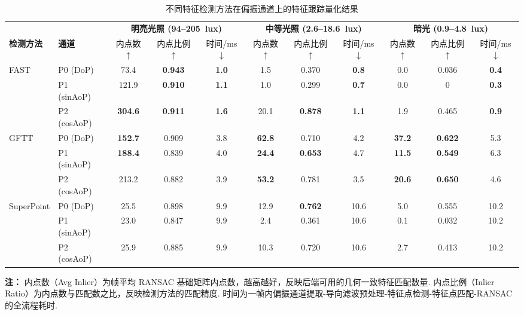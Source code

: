 
\begin{table}[t]
\centering
\caption{不同特征检测方法在偏振通道上的特征跟踪量化结果}
\label{tab:fp_metrics}
\footnotesize
\setlength{\tabcolsep}{3.5pt}
\begin{tabular}{llccccccccc}
\toprule
& & \multicolumn{3}{c}{\bfseries 明亮光照 (94--205~lux)} & \multicolumn{3}{c}{\bfseries 中等光照 (2.6--18.6~lux)} & \multicolumn{3}{c}{\bfseries 暗光 (0.9--4.8~lux)} \\
\cmidrule(lr){3-5} \cmidrule(lr){6-8} \cmidrule(lr){9-11}
\multirow{-2}{*}{\bfseries 检测方法} & \multirow{-2}{*}{\bfseries 通道} & 内点数$\uparrow$ & 内点比例$\uparrow$ & 时间/ms$\downarrow$ & 内点数$\uparrow$ & 内点比例$\uparrow$ & 时间/ms$\downarrow$ & 内点数$\uparrow$ & 内点比例$\uparrow$ & 时间/ms$\downarrow$ \\
\midrule

\multirow{3}{*}{FAST}
    & P0 (DoP)     & 73.4  & \textbf{0.943} & \textbf{1.0}  & 1.5   & 0.370 & \textbf{0.8}  & 0.0   & 0.036 & \textbf{0.4} \\
    & P1 (sinAoP)  & 121.9 & \textbf{0.910} & \textbf{1.1}  & 1.0   & 0.299 & \textbf{0.7}  & 0.0   & 0     & \textbf{0.3} \\
    & P2 (cosAoP)  & \textbf{304.6} & \textbf{0.911} & \textbf{1.6}  & 20.1  & \textbf{0.878} & \textbf{1.1}  & 1.9   & 0.465 & \textbf{0.9} \\
\cmidrule{2-11}

\multirow{3}{*}{GFTT}
    & P0 (DoP)     & \textbf{152.7} & 0.909 & 3.8  & \textbf{62.8} & 0.710 & 4.2  & \textbf{37.2} & \textbf{0.622} & 5.3 \\
    & P1 (sinAoP)  & \textbf{188.4} & 0.839 & 4.0  & \textbf{24.4} & \textbf{0.653} & 4.7  & \textbf{11.5} & \textbf{0.549} & 6.3 \\
    & P2 (cosAoP)  & 213.2 & 0.882 & 3.9  & \textbf{53.2} & 0.781 & 3.5  & \textbf{20.6} & \textbf{0.650} & 4.6 \\
\cmidrule{2-11}

\multirow{3}{*}{SuperPoint}
    & P0 (DoP)     & 25.5  & 0.898 & 9.9  & 12.9  & \textbf{0.762} & 10.6 & 5.0   & 0.555 & 10.2 \\
    & P1 (sinAoP)  & 23.0  & 0.847 & 9.9  & 2.4   & 0.361 & 10.6 & 0.1   & 0.032 & 10.2 \\
    & P2 (cosAoP)  & 25.9  & 0.885 & 9.9  & 10.3  & 0.720 & 10.6 & 2.7   & 0.413 & 10.2 \\

\midrule
\end{tabular}

\vspace{4pt}
\begin{minipage}{\textwidth}
\footnotesize
\textbf{注：}
内点数（Avg Inlier）为帧平均 RANSAC 基础矩阵内点数，越高越好，反映后端可用的几何一致特征匹配数量.
内点比例（Inlier Ratio）为内点数与匹配数之比，反映检测方法的匹配精度.
时间为一帧内偏振通道提取-导向滤波预处理-特征点检测-特征点匹配-RANSAC的全流程耗时.
\end{minipage}
\end{table}
